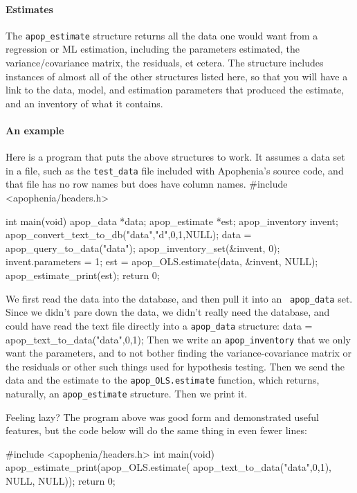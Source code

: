 \paragraph{Estimates}
The {\tt apop\_estimate} structure returns all the data one would want
from a regression or ML estimation, including the parameters estimated,
the variance/covariance matrix, the residuals, et cetera. The structure
includes instances of almost all of the other structures listed here, so
that you will have a link to the data, model, and estimation parameters
that produced the estimate, and an inventory of what it contains.

\paragraph{An example}
Here is a program that puts the above structures to work.  It assumes a
data set in a file, such as the {\tt test\_data} file included with
Apophenia's source code, and that file has no row names but does have
column names.
#include <apophenia/headers.h>

int main(void){
apop_data       *data;
apop_estimate   *est;
apop_inventory  invent;
    apop_convert_text_to_db("data","d",0,1,NULL);
    data       = apop_query_to_data("data");
    apop_inventory_set(&invent, 0);
    invent.parameters   = 1;
    est  = apop_OLS.estimate(data, &invent, NULL);
    apop_estimate_print(est);
    return 0;
}

We first read the data into the database, and then pull it into an {\tt
apop\_\-data} set. Since we didn't pare down the data, we didn't really
need the database, and could have read the text file directly into a
{\tt apop\_\-data} structure:
    data       = apop_text_to_data("data",0,1);
Then we write an {\tt apop\_\-inventory} that we only want the
parameters, and to not bother finding the variance-covariance matrix or
the residuals or other such things used for hypothesis testing. Then we
send the data and the estimate to the {\tt apop\_\-OLS.est\-i\-mate}
function, which returns, naturally, an {\tt apop\_\-est\-i\-mate}
structure. Then we print it.

Feeling lazy? The program above was good form and demonstrated useful
features, but the code below will do the same thing in even fewer lines:

#include <apophenia/headers.h>
int main(void){
    apop_estimate_print(apop_OLS.estimate(
         apop_text_to_data("data",0,1), NULL, NULL));
    return 0; }

